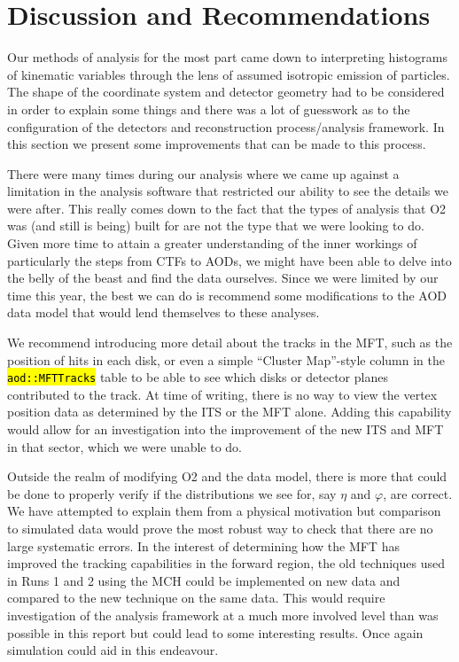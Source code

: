 \documentclass[11pt]{article}
\numberwithin{equation}{section}
\numberwithin{figure}{section}
\numberwithin{table}{section}
\let\OldTexttt\texttt
\renewcommand{\texttt}[1]{\OldTexttt{\hl{#1}}}
\begin{document}
\section{Discussion and Recommendations}\label{sec:DiscussionRecommendations}
Our methods of analysis for the most part came down to interpreting histograms of kinematic variables through the lens of assumed isotropic emission of particles. The shape of the coordinate system and detector geometry had to be considered in order to explain some things and there was a lot of guesswork as to the configuration of the detectors and reconstruction process/analysis framework. In this section we present some improvements that can be made to this process.

There were many times during our analysis where we came up against a limitation in the analysis software that restricted our ability to see the details we were after. This really comes down to the fact that the types of analysis that O2 was (and still is being) built for are not the type that we were looking to do. Given more time to attain a greater understanding of the inner workings of particularly the steps from CTFs to AODs, we might have been able to delve into the belly of the beast and find the data ourselves. Since we were limited by our time this year, the best we can do is recommend some modifications to the AOD data model that would lend themselves to these analyses. 

We recommend introducing more detail about the tracks in the MFT, such as the position of hits in each disk, or even a simple ``Cluster Map''-style column in the \texttt{aod::MFTTracks} table to be able to see which disks or detector planes contributed to the track. At time of writing, there is no way to view the vertex position data as determined by the ITS or the MFT alone. Adding this capability would allow for an investigation into the improvement of the new ITS and MFT in that sector, which we were unable to do.

Outside the realm of modifying O2 and the data model, there is more that could be done to properly verify if the distributions we see for, say $\eta$ and $\varphi$, are correct. We have attempted to explain them from a physical motivation but comparison to simulated data would prove the most robust way to check that there are no large systematic errors. In the interest of determining how the MFT has improved the tracking capabilities in the forward region, the old techniques used in Runs 1 and 2 using the MCH could be implemented on new data and compared to the new technique on the same data. This would require investigation of the analysis framework at a much more involved level than was possible in this report but could lead to some interesting results. Once again simulation could aid in this endeavour. 
\end{document}
